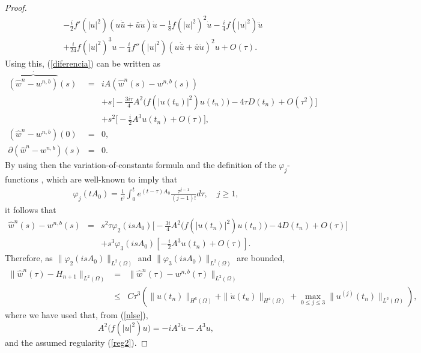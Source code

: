 \documentclass[a4paper,12pt]{article}
\begin{document}
\begin{proof}
\begin{eqnarray}
&&-\frac{i}{2}f'(|u|^2)(u \dot{\bar{u}}+\bar{u} \dot{u})\dot{u}-\frac{1}{8}f(|u|^2)^2 \dot{u}-\frac{i}{4}f(|u|^2) \ddot{u} \nonumber \\
&&+\frac{i}{24}f(|u|^2)^3 u -\frac{i}{4} f''(|u|^2)(u \dot{\bar{u}}+\bar{u}\dot{u})^2 u +O(\tau). \nonumber
\end{eqnarray}
Using this, (\ref{diferencia}) can be written as
\begin{eqnarray}
\stackrel{\cdot}{\overbrace{(\hat{w}^n-w^{n,b})}}(s)&=&i A (\hat{w}^n(s)-w^{n,b}(s)) \nonumber \\
&&+s \big[-\frac{3 i \tau}{4}A^2 \big( f(|u(t_n)|^2) u(t_n)\big)-4 \tau D(t_n) +O(\tau^2)\big] \nonumber \\
&&+ s^2 \big[ -\frac{i}{2} A^3 u (t_n)+O(\tau) \big], \nonumber \\
(\hat{w}^n-w^{n,b})(0)&=&0, \nonumber \\
\partial (\hat{w}^n-w^{n,b})(s)&=&0. \label{diferenciab}
\end{eqnarray}
By using then the variation-of-constants formula and the definition of the $\varphi_j$-functions \cite{HO} , which are well-known to imply that
\begin{eqnarray}
\varphi_j( t A_0)=\frac{1}{t^j} \int_0^t
e^{(t-\tau)A_0}\frac{\tau^{j-1}}{(j-1)!}d\tau, \quad j \ge 1,
\nonumber
\end{eqnarray}
it follows that
\begin{eqnarray}
\hat{w}^n(s)-w^{n,b}(s)&=&s^2 \tau \varphi_2(i s A_0)\big[-\frac{3 i}{4}A^2 \big( f(|u(t_n)|^2) u(t_n)\big)-4 D(t_n) +O(\tau)\big]
\nonumber \\
 &&+s^3  \varphi_3(i s A_0)[-\frac{i}{2} A^3 u(t_n)+O(\tau)].
\label{exprphi}
\end{eqnarray}
Therefore, as $\|\varphi_2(i s A_0)\|_{L^2(\Omega)}$ and $\|\varphi_3(i s A_0)\|_{L^2(\Omega)}$ are bounded,
\begin{eqnarray}
\|\hat{w}^n(\tau)-H_{n+1}\|_{L^2(\Omega)}&=&\|\hat{w}^n(\tau)-w^{n,b}(\tau)\|_{L^2(\Omega)} \nonumber \\
&\le& C \tau^3 (\|u(t_n)\|_{H^6(\Omega)}+\|\dot{u}(t_n)\|_{H^4(\Omega)}+\max_{0\le j \le 3} \|u^{(j)}(t_n)\|_{L^2(\Omega)}),
\nonumber
\end{eqnarray}
where we have used that, from (\ref{nlse}),
$$A^2 \big( f(|u|^2)u\big)=-i A^2 \dot{u}-A^3 u,$$
and the assumed regularity (\ref{reg2}).


\end{proof}
\end{document}
